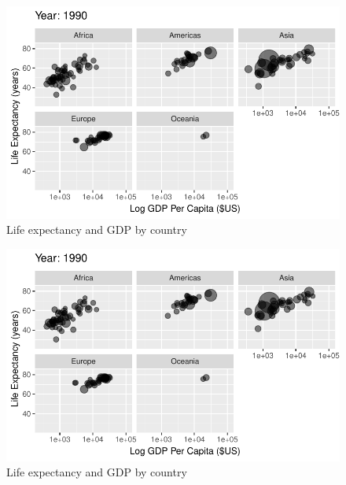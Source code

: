 \documentclass[
  letterpaper,
  DIV=11,
  numbers=noendperiod]{scrreport}
\theoremstyle{definition}
\theoremstyle{remark}
\begin{document}
\begin{figure}

{\centering \includegraphics{index_files/figure-pdf/fig-anim-lifegdp-69.pdf}

}

\caption{\label{fig-anim-lifegdp-69}Life expectancy and GDP by country}

\end{figure}

\begin{figure}

{\centering \includegraphics{index_files/figure-pdf/fig-anim-lifegdp-70.pdf}

}

\caption{\label{fig-anim-lifegdp-70}Life expectancy and GDP by country}

\end{figure}
\end{document}
